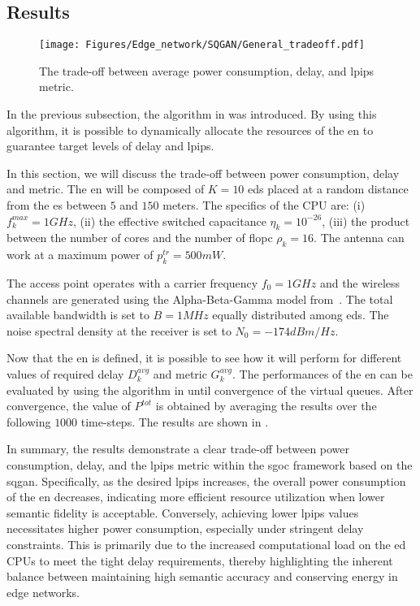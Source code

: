 \subsection{Results}
\begin{figure}
    \centering
    \texttt{[image: Figures/Edge\_network/SQGAN/General\_tradeoff.pdf]}
    \caption[Semantic-Goal-Oriented communication Edge Network trade-off plot]{The trade-off between average power consumption, delay, and \gls{lpips} metric.}
    \label{fig: EN_nn power-delay-metric trade-off}
\end{figure}
In the previous subsection, the algorithm in  was introduced. By using this algorithm, it is possible to dynamically allocate the resources of the \gls{en} to guarantee target levels of delay and \gls{lpips}.

In this section, we will discuss the trade-off between power consumption, delay and metric. The \gls{en} will be composed of $K=10$ \glspl{ed} placed at a random distance from the \gls{es} between $5$ and $150$ meters. The specifics of the CPU are: (i) $f_k^{max}=1GHz$, (ii) the effective switched capacitance $\eta_k = 10^{-26}$, (iii) the product between the number of cores and the number of \gls{flopc} $\rho_k=16$. The antenna can work at a maximum power of $p_k^{tr}=500mW$.

The access point operates with a carrier frequency $f_0 = 1GHz$ and the wireless channels are generated using the Alpha-Beta-Gamma model from~\cite{MacCartney2016AlphaBetaGamma}. The total available bandwidth is set to $ B = 1MHz $ equally distributed among \glspl{ed}. The noise spectral density at the receiver is set to $ N_0 = -174dBm/Hz $.

Now that the \gls{en} is defined, it is possible to see how it will perform for different values of required delay $D_k^{avg}$ and metric $G_k^{avg}$. The performances of the \gls{en} can be evaluated by using the algorithm in  until convergence of the virtual queues. After convergence, the value of $P^{tot}$ is obtained by averaging the results over the following $1000$ time-steps. The results are shown in .

In summary, the results demonstrate a clear trade-off between power consumption, delay, and the \gls{lpips} metric within the \gls{sgoc} framework based on the \gls{sqgan}. Specifically, as the desired \gls{lpips} increases, the overall power consumption of the \gls{en} decreases, indicating more efficient resource utilization when lower semantic fidelity is acceptable. Conversely, achieving lower \gls{lpips} values necessitates higher power consumption, especially under stringent delay constraints. This is primarily due to the increased computational load on the \gls{ed} CPUs to meet the tight delay requirements, thereby highlighting the inherent balance between maintaining high semantic accuracy and conserving energy in edge networks.\\

